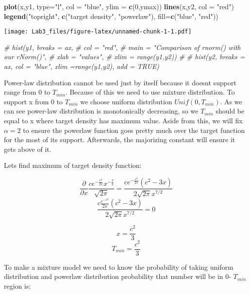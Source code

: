 \documentclass[
]{article}
\newenvironment{Shaded}{\begin{snugshade}}{\end{snugshade}}
\newcommand{\CommentTok}[1]{\textcolor[rgb]{0.56,0.35,0.01}{\textit{#1}}}
\newcommand{\DataTypeTok}[1]{\textcolor[rgb]{0.13,0.29,0.53}{#1}}
\newcommand{\DecValTok}[1]{\textcolor[rgb]{0.00,0.00,0.81}{#1}}
\newcommand{\KeywordTok}[1]{\textcolor[rgb]{0.13,0.29,0.53}{\textbf{#1}}}
\newcommand{\NormalTok}[1]{#1}
\newcommand{\StringTok}[1]{\textcolor[rgb]{0.31,0.60,0.02}{#1}}
\begin{document}
\begin{Shaded}
\begin{Highlighting}[]
\KeywordTok{plot}\NormalTok{(x,y1, }\DataTypeTok{type=}\StringTok{"l"}\NormalTok{, }\DataTypeTok{col =} \StringTok{"blue"}\NormalTok{, }\DataTypeTok{ylim =} \KeywordTok{c}\NormalTok{(}\DecValTok{0}\NormalTok{,ymax))}
\KeywordTok{lines}\NormalTok{(x,y2, }\DataTypeTok{col =} \StringTok{"red"}\NormalTok{)}
\KeywordTok{legend}\NormalTok{(}\StringTok{"topright"}\NormalTok{, }\KeywordTok{c}\NormalTok{(}\StringTok{"target density"}\NormalTok{, }\StringTok{"powerlaw"}\NormalTok{), }\DataTypeTok{fill=}\KeywordTok{c}\NormalTok{(}\StringTok{"blue"}\NormalTok{, }\StringTok{"red"}\NormalTok{))}
\end{Highlighting}
\end{Shaded}

\texttt{[image: Lab3\_files/figure-latex/unnamed-chunk-1-1.pdf]}

\begin{Shaded}
\begin{Highlighting}[]
\CommentTok{# hist(y1, breaks = ax,}
\CommentTok{#      col = "red",}
\CommentTok{#      main = "Comparison of rnorm()  with our rNorm()",}
\CommentTok{#      xlab = "values",}
\CommentTok{#      xlim = range(y1,y2))}
\CommentTok{# }
\CommentTok{# hist(y2, breaks = ax, col = "blue",  xlim =range(y1,y2), add = TRUE)}
\end{Highlighting}
\end{Shaded}

Power-law distribution cannot be used just by itself because it doesnt
support range from 0 to \(T_{min}\). Because of this we need to use
mixture distribution. To support x from 0 to \(T_{min}\) we choose
uniform distribution \(Unif(0,T_{min})\). As we can see power-law
distribution is monotonically decreasing, so we \(T_{min}\) should be
equal to x where target density has maximum value. Aside from this, we
will fix \(\alpha=2\) to ensure the powerlaw function goes pretty much
over the target function for the most of its support. Afterwards, the
majorizing constant will ensure it gets above of it.

Lets find maximum of target density function:

\[\frac{\partial }{\partial x}\frac{c e^{-\frac{c^2}{2 x}} x^{-\frac{3}{2}}}{\sqrt{2 \pi }}=\frac{c e^{-\frac{c^2}{2 x}} \left(c^2-3 x\right)}{2 \sqrt{2 \pi } x^{7/2}}\]
\[\frac{c \frac{e^{-c^2}}{2 x} \left(c^2-3 x\right)}{2 \sqrt{2 \pi } x^{7/2}}=0\]

\[x=\frac{c^2}{3}\] \[T_{min} = \frac {c^2} 3\]

To make a mixture model we need to know the probability of taking
uniform distribution and powerlaw distribution probability that number
will be in 0- \(T_{min}\) region is:
\end{document}
